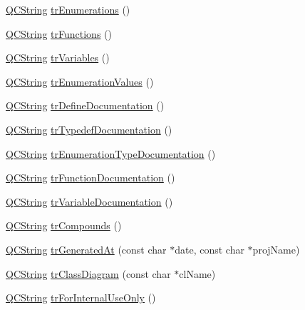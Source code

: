 \begin{DoxyCompactItemize}
\mbox{\hyperlink{class_q_c_string}{Q\+C\+String}} \mbox{\hyperlink{class_translator_polish_a06464fe1c54e08523ce645256523dc8c}{tr\+Enumerations}} ()
\item 
\mbox{\hyperlink{class_q_c_string}{Q\+C\+String}} \mbox{\hyperlink{class_translator_polish_a8648a7b233ad0a4735508a56778183df}{tr\+Functions}} ()
\item 
\mbox{\hyperlink{class_q_c_string}{Q\+C\+String}} \mbox{\hyperlink{class_translator_polish_a027fd50abf0810dceb10013eb120f949}{tr\+Variables}} ()
\item 
\mbox{\hyperlink{class_q_c_string}{Q\+C\+String}} \mbox{\hyperlink{class_translator_polish_acc1f2f424ed7b646b977d05bc05bc44f}{tr\+Enumeration\+Values}} ()
\item 
\mbox{\hyperlink{class_q_c_string}{Q\+C\+String}} \mbox{\hyperlink{class_translator_polish_aae92c2bc5e08a531f02642f5250656fd}{tr\+Define\+Documentation}} ()
\item 
\mbox{\hyperlink{class_q_c_string}{Q\+C\+String}} \mbox{\hyperlink{class_translator_polish_a383494e2858ddb74722dd7dc5ca074a0}{tr\+Typedef\+Documentation}} ()
\item 
\mbox{\hyperlink{class_q_c_string}{Q\+C\+String}} \mbox{\hyperlink{class_translator_polish_a7f0fea215fca2d7bb011d5c8c24fe762}{tr\+Enumeration\+Type\+Documentation}} ()
\item 
\mbox{\hyperlink{class_q_c_string}{Q\+C\+String}} \mbox{\hyperlink{class_translator_polish_a188cef323586d441f24e08219f6e91ef}{tr\+Function\+Documentation}} ()
\item 
\mbox{\hyperlink{class_q_c_string}{Q\+C\+String}} \mbox{\hyperlink{class_translator_polish_ae02bdc7d806b48abbc262905706d8b29}{tr\+Variable\+Documentation}} ()
\item 
\mbox{\hyperlink{class_q_c_string}{Q\+C\+String}} \mbox{\hyperlink{class_translator_polish_a19efe93e03eabd2768c0db860d823c2e}{tr\+Compounds}} ()
\item 
\mbox{\hyperlink{class_q_c_string}{Q\+C\+String}} \mbox{\hyperlink{class_translator_polish_a80e062bbff8e4ee541ac336cbe8943b7}{tr\+Generated\+At}} (const char $\ast$date, const char $\ast$proj\+Name)
\item 
\mbox{\hyperlink{class_q_c_string}{Q\+C\+String}} \mbox{\hyperlink{class_translator_polish_a9c1f72c3c22421dc45c3cb5986eeaa29}{tr\+Class\+Diagram}} (const char $\ast$cl\+Name)
\item 
\mbox{\hyperlink{class_q_c_string}{Q\+C\+String}} \mbox{\hyperlink{class_translator_polish_a75a159a05f97393a3032f4a7a9e0814f}{tr\+For\+Internal\+Use\+Only}} ()

\end{DoxyCompactItemize}
